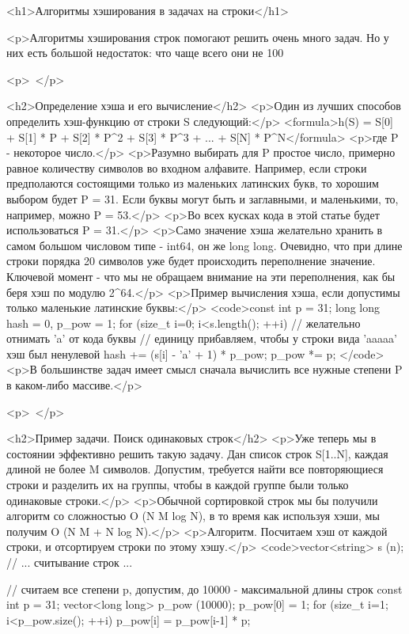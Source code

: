 <h1>Алгоритмы хэширования в задачах на строки</h1>

<p>Алгоритмы хэширования строк помогают решить очень много задач. Но у них есть большой недостаток: что чаще всего они не 100%

<p> </p>

<h2>Определение хэша и его вычисление</h2>
<p>Один из лучших способов определить хэш-функцию от строки S следующий:</p>
<formula>h(S)  =  S[0]  +  S[1] * P  +  S[2] * P^2  +  S[3] * P^3  +  ...  +  S[N] * P^N</formula>
<p>где P - некоторое число.</p>
<p>Разумно выбирать для P простое число, примерно равное количеству символов во входном алфавите. Например, если строки предполаются состоящими только из маленьких латинских букв, то хорошим выбором будет P = 31. Если буквы могут быть и заглавными, и маленькими, то, например, можно P = 53.</p>
<p>Во всех кусках кода в этой статье будет использоваться P = 31.</p>
<p>Само значение хэша желательно хранить в самом большом числовом типе - int64, он же long long. Очевидно, что при длине строки порядка 20 символов уже будет происходить переполнение значение. Ключевой момент - что мы не обращаем внимание на эти переполнения, как бы беря хэш по модулю 2^64.</p>
<p>Пример вычисления хэша, если допустимы только маленькие латинские буквы:</p>
<code>const int p = 31;
long long hash = 0, p_pow = 1;
for (size_t i=0; i<s.length(); ++i)
{
	// желательно отнимать 'a' от кода буквы
	// единицу прибавляем, чтобы у строки вида 'aaaaa' хэш был ненулевой
	hash += (s[i] - 'a' + 1) * p_pow;
	p_pow *= p;
}</code>
<p>В большинстве задач имеет смысл сначала вычислить все нужные степени P в каком-либо массиве.</p>

<p> </p>

<h2>Пример задачи. Поиск одинаковых строк</h2>
<p>Уже теперь мы в состоянии эффективно решить такую задачу. Дан список строк S[1..N], каждая длиной не более M символов. Допустим, требуется найти все повторяющиеся строки и разделить их на группы, чтобы в каждой группе были только одинаковые строки.</p>
<p>Обычной сортировкой строк мы бы получили алгоритм со сложностью O (N M log N), в то время как используя хэши, мы получим O (N M + N log N).</p>
<p>Алгоритм. Посчитаем хэш от каждой строки, и отсортируем строки по этому хэшу.</p>
<code>vector<string> s (n);
// ... считывание строк ...

// считаем все степени p, допустим, до 10000 - максимальной длины строк
const int p = 31;
vector<long long> p_pow (10000);
p_pow[0] = 1;
for (size_t i=1; i<p_pow.size(); ++i)
	p_pow[i] = p_pow[i-1] * p;

